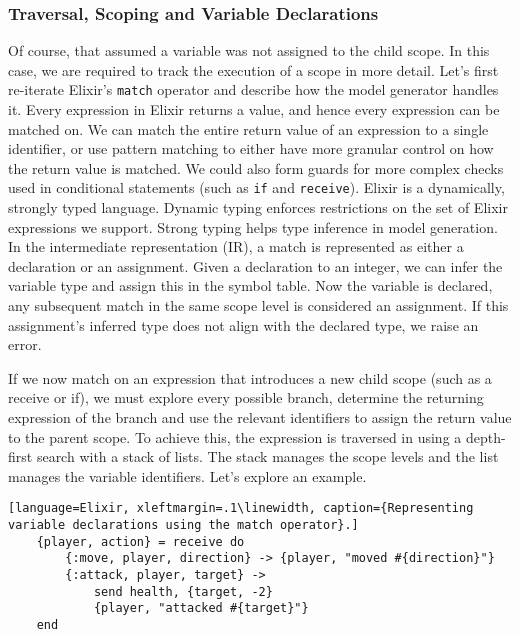 \subsubsection{Traversal, Scoping and Variable Declarations}
Of course, that assumed a variable was not assigned to the child scope. In this case, we are required to track the execution of a scope in more detail. Let's first re-iterate Elixir's \texttt{match} operator and describe how the model generator handles it. Every expression in Elixir returns a value, and hence every expression can be matched on. We can match the entire return value of an expression to a single identifier, or use pattern matching to either have more granular control on how the return value is matched. We could also form guards for more complex checks used in conditional statements (such as \texttt{if} and \texttt{receive}). Elixir is a dynamically, strongly typed language. Dynamic typing enforces restrictions on the set of Elixir expressions we support. Strong typing helps type inference in model generation. In the intermediate representation (IR), a match is represented as either a declaration or an assignment. Given a declaration to an integer, we can infer the variable type and assign this in the symbol table. Now the variable is declared, any subsequent match in the same scope level is considered an assignment. If this assignment's inferred type does not align with the declared type, we raise an error.
\par
If we now match on an expression that introduces a new child scope (such as a receive or if), we must explore every possible branch, determine the returning expression of the branch and use the relevant identifiers to assign the return value to the parent scope. To achieve this, the expression is traversed in using a depth-first search with a stack of lists. The stack manages the scope levels and the list manages the variable identifiers. Let's explore an example.
\begin{lstlisting}[language=Elixir, xleftmargin=.1\linewidth, caption={Representing variable declarations using the match operator}.]
    {player, action} = receive do
        {:move, player, direction} -> {player, "moved #{direction}"}
        {:attack, player, target} -> 
            send health, {target, -2}
            {player, "attacked #{target}"}
    end
\end{lstlisting}
